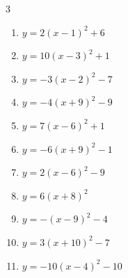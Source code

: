 \begin{multicols}{3}
\begin{enumerate}
        \phantom{$\displaystyle 頂点\left( -6 , 2 \right)$}

  \item $\displaystyle y=2\left( x-1\right)^{2}+6$

        \phantom{$\displaystyle 頂点\left( 1 , 6 \right)$}

\columnbreak %

\resetques

  \item $\displaystyle y=10\left( x-3\right)^{2}+1$

        \phantom{$\displaystyle 頂点\left( 3 , 1 \right)$}

  \item $\displaystyle y=-3\left( x-2\right)^{2}-7$

        \phantom{$\displaystyle 頂点\left( 2 , -7 \right)$}

  \item $\displaystyle y=-4\left( x+9\right)^{2}-9$

        \phantom{$\displaystyle 頂点\left( -9 , -9 \right)$}

  \item $\displaystyle y=7\left( x-6\right)^{2}+1$

        \phantom{$\displaystyle 頂点\left( 6 , 1 \right)$}

  \item $\displaystyle y=-6\left( x+9\right)^{2}-1$

        \phantom{$\displaystyle 頂点\left( -9 , -1 \right)$}

  \item $\displaystyle y=2\left( x-6\right)^{2}-9$

        \phantom{$\displaystyle 頂点\left( 6 , -9 \right)$}

  \item $\displaystyle y=6\left( x+8\right)^{2}$

        \phantom{$\displaystyle 頂点\left( -8 , 0 \right)$}

  \item $\displaystyle y=-\left( x-9\right)^{2}-4$

        \phantom{$\displaystyle 頂点\left( 9 , -4 \right)$}

  \item $\displaystyle y=3\left( x+10\right)^{2}-7$

        \phantom{$\displaystyle 頂点\left( -10 , -7 \right)$}

  \item $\displaystyle y=-10\left( x-4\right)^{2}-10$


\end{enumerate}
\end{multicols}

